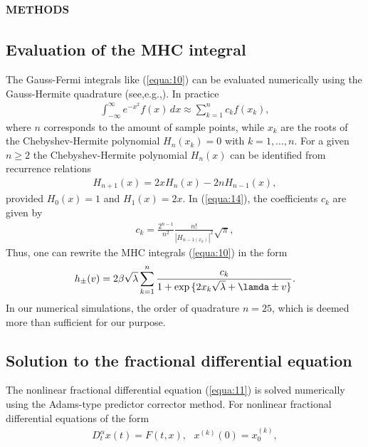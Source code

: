 \documentclass[10pt]{article}
\begin{document}
\begin{multicols}{2}
{        \section{\scshape methods}
        }
        {\centering \subsection{Evaluation of the MHC integral}}
        The Gauss-Fermi integrals like (\ref{equa:10}) can be evaluated numerically using the Gauss-Hermite quadrature (see,e.g.,). In practice
        \begin{align}
            \int_{- \infty}^\infty e^{-x^2} f(x) \,dx \approx \sum_{k=1}^n c_k f(x_k), \label{equa:14}
        \end{align}
        where $n$ corresponds to the amount of sample points, while $x_k$ are the roots of the Chebyshev-Hermite polynomial $H_n (x_k) = 0$ with $k=1,\dots,n$. For a given $n \ge 2$ the Chebyshev-Hermite polynomial $H_n (x)$ can be identified from recurrence relations
        \begin{align}
            H_{n+1}(x) = 2xH_n(x) - 2nH_{n-1}(x), \label{equa:15}
        \end{align}
        provided $H_0(x)=1$ and $H_1(x) = 2x$. In (\ref{equa:14}), the coefficients $c_k$ are given by
        \begin{align}
            c_k = \frac{2^{n-1}}{n^2} \frac{n!}{|H_{n-1 (x_k)}|^2} \sqrt{\pi}, \label{equa:16}
        \end{align}
        Thus, one can rewrite the MHC integrals (\ref{equa:10}) in the form
        \begin{align}
            h_{\pm}(v)=2 \beta \sqrt{\lambda} \sum_{k=1}^n \frac{c_k}{1+\exp{\{2x_k \sqrt{\lambda} + \lamda \pm v\}}}. \label{equa:17}
        \end{align}
        In our numerical simulations, the order of quadrature $n = 25$, which is deemed more than sufficient for our purpose.
        \par
        {\centering \subsection{Solution to the fractional differential equation}}
        The nonlinear fractional differential equation (\ref{equa:11}) is solved numerically using the Adams-type predictor corrector method. For nonlinear fractional differential equations of the form
        \begin{align}
            D_t^\alpha x(t) = F(t,x), ~~~ x^{(k)}(0) = x_0^{(k)}, \label{equa:18}

\end{align}
\end{multicols}
\end{document}
